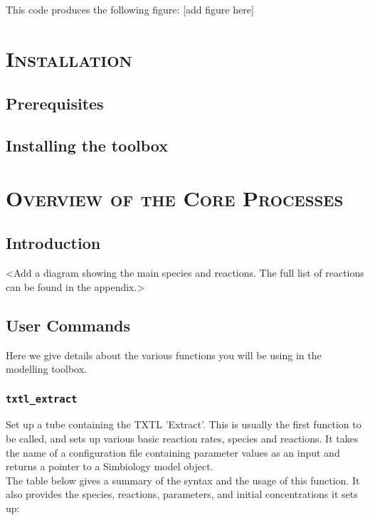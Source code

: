 \documentclass[english]{report}
\begin{document}
\noindent This code produces the following figure: [add figure here]


\chapter{\textsc{Installation}}
	\section{Prerequisites}
	\section{Installing the toolbox}
	
\chapter{\textsc{Overview of the Core Processes}} %
	\section{Introduction}
	<Add a diagram showing the main species and reactions. The full list of reactions can be found in the appendix.>
	\section{User Commands}	
	Here we give details about the various functions you will be using in the modelling toolbox. 	
		\subsection*{\texttt{txtl\_extract}}
			Set up a tube containing the TXTL 'Extract'. This is usually the first function to be called, and sets up various basic reaction rates, species and reactions. It takes the name of a configuration file containing parameter values as an input and returns a pointer to a Simbiology model object.  \\		
			
			The table below gives a summary of the syntax and the usage of this function. It also provides the species, reactions, parameters, and initial concentrations it sets up:
			
\end{document}
